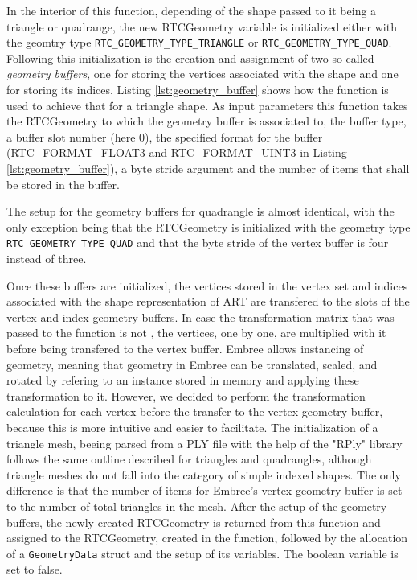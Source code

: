 In the interior of this function, depending of the shape passed to it being a triangle or quadrange, the new RTCGeometry variable is initialized either with the geomtry type \texttt{RTC\_GEOMETRY\_TYPE\_TRIANGLE} or \texttt{RTC\_GEOMETRY\_TYPE\_QUAD}. Following this initialization is the creation and assignment of two so-called \emph{geometry buffers}, one for storing the vertices associated with the shape and one for storing its indices. Listing \ref{lst:geometry_buffer} shows how the function  is used to achieve that for a triangle shape. As input parameters this function takes the RTCGeometry to which the geometry buffer is associated to, the buffer type, a buffer slot number (here 0), the specified format for the buffer (RTC\_FORMAT\_FLOAT3 and RTC\_FORMAT\_UINT3 in Listing \ref{lst:geometry_buffer}), a byte stride argument and the number of items that shall be stored in the buffer. 

The setup for the geometry buffers for quadrangle is almost identical, with the only exception being that the RTCGeometry is initialized with the geometry type \texttt{RTC\_GEOMETRY\_TYPE\_QUAD} and that the byte stride of the vertex buffer is four instead of three.

Once these buffers are initialized, the vertices stored in the vertex set and indices associated with the shape representation of ART are transfered to the slots of the vertex and index geometry buffers. In case the transformation matrix that was passed to the function is not , the vertices, one by one, are multiplied with it before being transfered to the vertex buffer. Embree allows instancing of geometry, meaning that geometry in Embree can be translated, scaled, and rotated by refering to an instance stored in memory and applying these transformation to it.  However, we decided to perform the transformation calculation for each vertex before the transfer to the vertex geometry buffer, because this is more intuitive and easier to facilitate.
The initialization of a triangle mesh, beeing parsed from a PLY file with the help of the "RPly" library \cite{rply2016} follows the same outline described for triangles and quadrangles, although triangle meshes do not fall into the category of simple indexed shapes. The only difference is that the number of items for Embree's vertex geometry buffer is set to the number of total triangles in the mesh.
After the setup of the geometry buffers, the newly created RTCGeometry is returned from this function and assigned to the RTCGeometry, created in the  function, followed by the allocation of a \texttt{GeometryData} struct and the setup of its variables. The  boolean variable is set to false.

